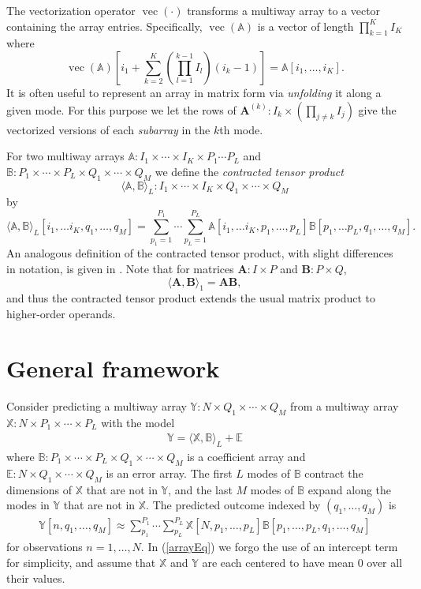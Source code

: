 \documentclass[12pt]{article}
\def\ctimes{\times \cdots \times}
\def\XX{\mathbb{X}}
\def\YY{\mathbb{Y}}
\def\EE{\mathbb{E}}
\def\A{\mathbf{A}}
\def\B{\mathbf{B}}
\def\AA{\mathbb{A}}
\def\BB{\mathbb{B}}
\def\B{\mathbf{B}}
\newcommand{\tprod}[3] {
  \langle #1, #2 \rangle_{#3}}
\DeclareMathOperator*{\vect}{vec}
\begin{document}
The vectorization operator $\vect(\cdot)$ transforms a multiway array to a vector containing the array entries.  Specifically, $\vect(\AA)$ is a vector of length $\prod_{k=1}^K I_K$ where 
\[\vect(\AA)\left[i_1+ \sum_{k=2}^K \left(\prod_{l=1}^{k-1} I_l \right) (i_k-1)\right] = \AA[i_1,\hdots,i_K].\] 
It is often useful to represent an array in matrix form via \emph{unfolding} it along a given mode.  For this purpose we let the rows of $\A^{(k)}: I_k \times \left(\prod_{j \neq k} I_j \right)$ give the vectorized versions of each \emph{subarray} in the $k$th mode.  


For two multiway arrays $\AA:I_1 \ctimes I_K \times P_1 \cdots P_L$ and $\BB:P_1 \ctimes P_L \times Q_1 \ctimes Q_M$ we define the \emph{contracted tensor product} 
\[\tprod{\AA}{\BB}{L}: I_1 \ctimes I_K \times Q_1 \ctimes Q_M\]
by 
\[\tprod{\AA}{\BB}{L}[i_1,\hdots i_K,q_1,\hdots,q_M] = \sum_{p_1=1}^{P_1} \cdots \sum_{p_L=1}^{P_L} \AA[i_1,\hdots i_K, p_1, \hdots, p_L] \BB[p_1,\hdots p_L, q_1, \hdots, q_M]. \]
An analogous definition of the contracted tensor product, with slight differences in notation, is given  in \citet{bader2006algorithm}.  Note that for matrices $\A: I \times P$ and $\B: P \times Q$,
\[\tprod{\A}{\B}{1} = \A \B,\]
and thus the contracted tensor product extends the usual matrix product to higher-order operands.  
    
\section{General framework}
\label{framework}

Consider predicting a multiway array $\YY: N \times Q_1 \ctimes Q_M$ from a multiway array $\XX: N \times P_1 \ctimes P_L$ with the model
\begin{align}
\YY = \tprod{\XX}{\BB}{L} + \EE 	\label{arrayEq}
\end{align}
where $\BB: P_1 \ctimes P_L \times Q_1 \ctimes Q_M$ is a coefficient array and $\EE: N \times Q_1 \ctimes Q_M$ is an error array.  The first $L$ modes of $\BB$ contract the dimensions of $\XX$ that are not in $\YY$, and the last $M$ modes of $\BB$ expand along the modes in $\YY$ that are not in $\XX$. The predicted outcome indexed by $(q_1,\hdots, q_M)$ is 
\begin{align}
\YY[n,q_1,\ldots,q_M] \approx \sum_{p_1}^{P_1} \cdots  \sum_{p_L}^{P_L} \XX[N,p_1,\hdots,p_L] \BB[p_1,\hdots,p_L,q_1,\hdots,q_M]  \label{outEq}  %
\end{align} 
for observations $n=1,\hdots,N$.  In (\ref{arrayEq}) we forgo the use of an  intercept term for simplicity, and assume that $\XX$ and $\YY$ are each centered to have mean $0$ over all their values.      
 
\end{document}

